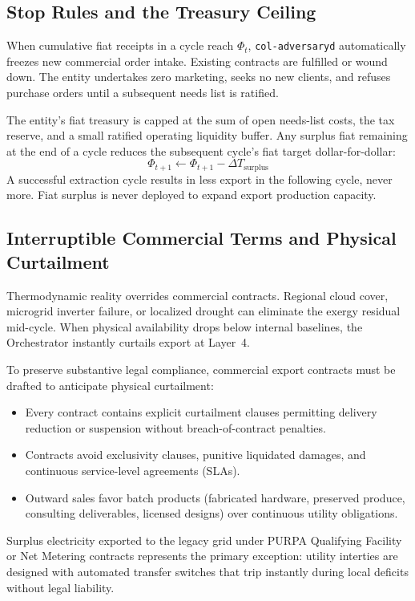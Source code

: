 \subsection{Stop Rules and the Treasury Ceiling}

When cumulative fiat receipts in a cycle reach $\Phi_t$, \texttt{col-adversaryd} automatically freezes new commercial order intake. Existing contracts are fulfilled or wound down. The entity undertakes zero marketing, seeks no new clients, and refuses purchase orders until a subsequent needs list is ratified.

The entity's fiat treasury is capped at the sum of open needs-list costs, the tax reserve, and a small ratified operating liquidity buffer. Any surplus fiat remaining at the end of a cycle reduces the subsequent cycle's fiat target dollar-for-dollar:
\begin{equation}
  \Phi_{t+1} \leftarrow \Phi_{t+1} - \Delta T_{\mathrm{surplus}}
\end{equation}
A successful extraction cycle results in less export in the following cycle, never more. Fiat surplus is never deployed to expand export production capacity.

\subsection{Interruptible Commercial Terms and Physical Curtailment}

Thermodynamic reality overrides commercial contracts. Regional cloud cover, microgrid inverter failure, or localized drought can eliminate the exergy residual mid-cycle. When physical availability drops below internal baselines, the Orchestrator instantly curtails export at Layer~4.

To preserve substantive legal compliance, commercial export contracts must be drafted to anticipate physical curtailment:
\begin{itemize}
  \item Every contract contains explicit curtailment clauses permitting delivery reduction or suspension without breach-of-contract penalties.
  \item Contracts avoid exclusivity clauses, punitive liquidated damages, and continuous service-level agreements (SLAs).
  \item Outward sales favor batch products (fabricated hardware, preserved produce, consulting deliverables, licensed designs) over continuous utility obligations.
\end{itemize}
Surplus electricity exported to the legacy grid under PURPA Qualifying Facility or Net Metering contracts represents the primary exception: utility interties are designed with automated transfer switches that trip instantly during local deficits without legal liability.

